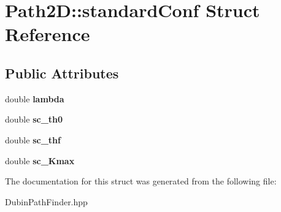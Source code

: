\hypertarget{struct_path2_d_1_1standard_conf}{}\section{Path2D\+:\+:standard\+Conf Struct Reference}
\label{struct_path2_d_1_1standard_conf}
\subsection*{Public Attributes}
\begin{DoxyCompactItemize}
\item 
\mbox{\label{struct_path2_d_1_1standard_conf_a33c42360d23d94f18e63010d5d6d783c}} 
double {\bfseries lambda}
\item 
\mbox{\label{struct_path2_d_1_1standard_conf_aa0bbbbdf1fca321e0b26410dece3aed8}} 
double {\bfseries sc\+\_\+th0}
\item 
\mbox{\label{struct_path2_d_1_1standard_conf_a7d5573b242cf65f0ce47b17505d91c2a}} 
double {\bfseries sc\+\_\+thf}
\item 
\mbox{\label{struct_path2_d_1_1standard_conf_a162ddbcba386dc15fae7aac27860df36}} 
double {\bfseries sc\+\_\+\+Kmax}
\end{DoxyCompactItemize}


The documentation for this struct was generated from the following file\+:\begin{DoxyCompactItemize}
\item 
Dubin\+Path\+Finder.\+hpp\end{DoxyCompactItemize}
